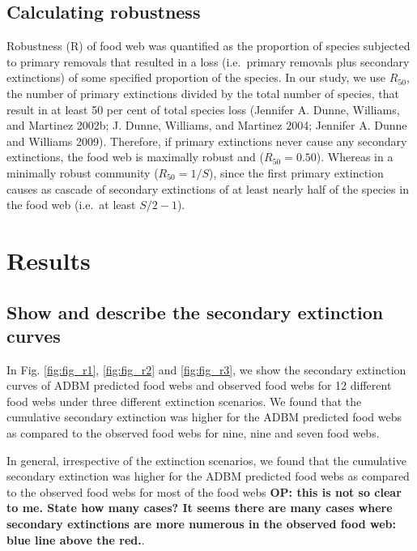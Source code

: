 \documentclass{article}
\begin{document}
\hypertarget{calculating-robustness}{%
\subsection{Calculating robustness}\label{calculating-robustness}}

Robustness (R) of food web was quantified as the proportion of species
subjected to primary removals that resulted in a loss (i.e.~primary
removals plus secondary extinctions) of some specified proportion of the
species. In our study, we use \(R_{50}\), the number of primary
extinctions divided by the total number of species, that result in at
least 50 per cent of total species loss (Jennifer A. Dunne, Williams,
and Martinez 2002b; J. Dunne, Williams, and Martinez 2004; Jennifer A.
Dunne and Williams 2009). Therefore, if primary extinctions never cause
any secondary extinctions, the food web is maximally robust and
(\(R_{50} = 0.50\)). Whereas in a minimally robust community
(\(R_{50} = 1/S\)), since the first primary extinction causes as cascade
of secondary extinctions of at least nearly half of the species in the
food web (i.e.~at least \(S/2 - 1\)).

\hypertarget{results}{%
\section{Results}\label{results}}

\hypertarget{show-and-describe-the-secondary-extinction-curves}{%
\subsection{Show and describe the secondary extinction
curves}\label{show-and-describe-the-secondary-extinction-curves}}

In Fig. \ref{fig:fig_r1}, \ref{fig:fig_r2} and \ref{fig:fig_r3}, we show
the secondary extinction curves of ADBM predicted food webs and observed
food webs for 12 different food webs under three different extinction
scenarios. We found that the cumulative secondary extinction was higher
for the ADBM predicted food webs as compared to the observed food webs
for nine, nine and seven food webs.

In general, irrespective of the extinction scenarios, we found that the
cumulative secondary extinction was higher for the ADBM predicted food
webs as compared to the observed food webs for most of the food webs
\textbf{OP: this is not so clear to me. State how many cases? It seems
there are many cases where secondary extinctions are more numerous in
the observed food web: blue line above the red.}.
\end{document}
